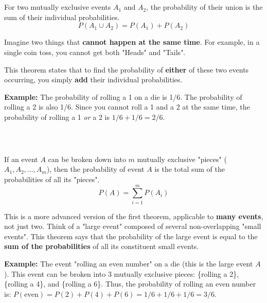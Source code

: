\begin{frame}[t]
\frametitle{\ }
  \vspace{-8mm}
  \footnotesize
  \begin{Teorema}
    For two mutually exclusive events $A_1$ and $A_2$, the probability of their union is the sum of their individual probabilities.
    \[
      P(A_1 \cup A_2) = P(A_1) + P(A_2)
    \]
  \end{Teorema}
  
  \vfill %
  \vspace{-5mm}
  \begin{block}{}
  \justifying
    Imagine two things that \textbf{cannot happen at the same time}. For example, in a single coin toss, you cannot get both "Heads" and "Tails".
    
    This theorem states that to find the probability of \textbf{either} of these two events occurring, you simply \textbf{add} their individual probabilities.
    
    \medskip %
    
    \textbf{Example:} The probability of rolling a 1 on a die is 1/6. The probability of rolling a 2 is also 1/6. Since you cannot roll a 1 and a 2 at the same time, the probability of rolling a 1 \textit{or} a 2 is $1/6 + 1/6 = 2/6$.
  \end{block}
  
\end{frame}

\begin{frame}[t]
\frametitle{\ }
  \vspace{-8mm}
  \footnotesize
  \begin{Teorema}
    If an event $A$ can be broken down into $m$ mutually exclusive "pieces" ($A_1, A_2, \dots, A_m$), then the probability of event $A$ is the total sum of the probabilities of all its "pieces".
    \[
      P(A) = \sum_{i=1}^{m} P(A_i)
    \]
  \end{Teorema}
  
  \vfill
  \vspace{-5mm}
  \begin{block}{}
    This is a more advanced version of the first theorem, applicable to \textbf{many events}, not just two. Think of a "large event" composed of several non-overlapping "small events". This theorem says that the probability of the large event is equal to the \textbf{sum of the probabilities} of all its constituent small events.
    
    \medskip
    
    \textbf{Example:} The event "rolling an even number" on a die (this is the large event $A$). This event can be broken into 3 mutually exclusive pieces: \{rolling a 2\}, \{rolling a 4\}, and \{rolling a 6\}. Thus, the probability of rolling an even number is:
    $P(\text{even}) = P(2) + P(4) + P(6) = 1/6 + 1/6 + 1/6 = 3/6$.
  \end{block}
  
\end{frame}

